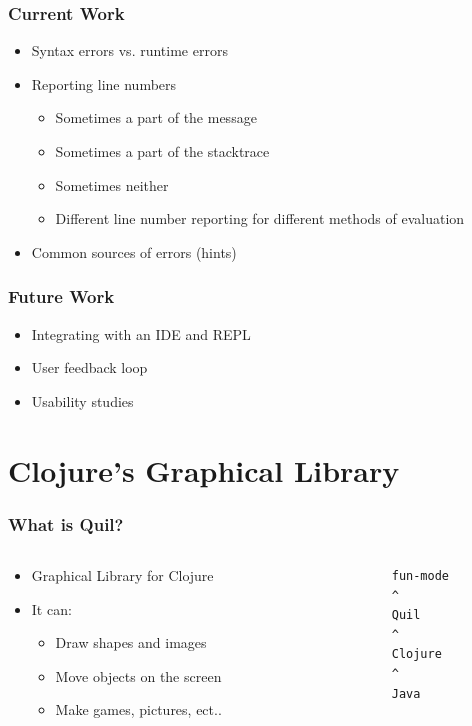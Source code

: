 \documentclass{beamer}
\begin{document}
\begin{frame}
	\frametitle{Current Work}
	\begin{itemize}
	\item Syntax errors vs. runtime errors
	\item Reporting line numbers	
		\begin{itemize}
		\item Sometimes a part of the message
		\item Sometimes a part of the stacktrace
		\item Sometimes neither
		\item Different line number reporting for different methods of evaluation
		\end{itemize}
	\item Common sources of errors (hints)
	\end{itemize}
\end{frame}

\begin{frame}
	\frametitle{Future Work}
	\begin{itemize}
	\item Integrating with an IDE and REPL
	\item User feedback loop
	\item Usability studies
	\end{itemize}
\end{frame}

\section{Clojure's Graphical Library}

\begin{frame}[fragile]
	\frametitle{What is Quil?}

  		\begin{columns}[t]
		\begin{column}{.55\textwidth}
		\begin{itemize}
  		\item Graphical Library for Clojure
  		\item It can:
  		\begin{itemize}
  	 		\item Draw shapes and images
  	 		\item Move objects on the screen
  	 		\item Make games, pictures, ect..
  		\end{itemize}
  		\end{itemize}
		\end{column}
		\begin{column}{.45\textwidth}
			\begin{verbatim}
			fun-mode
			^
			Quil
			^
			Clojure
			^
			Java
			\end{verbatim}
		\end{column}
		\end{columns}
\end{frame}
\end{document}
